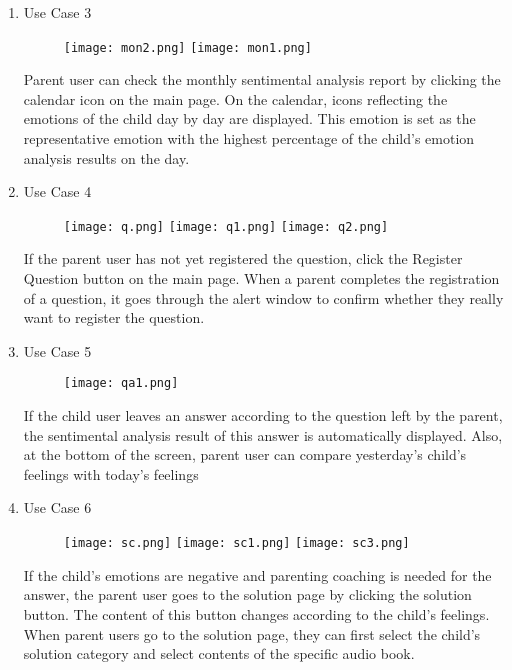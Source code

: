 \documentclass[conference]{IEEEtran}
\begin{document}
\begin{enumerate}
\begin{enumerate}
        \item Use Case 3
        \begin{figure}[H]
         \centering
         \texttt{[image: mon2.png]}
         \texttt{[image: mon1.png]}
         \end{figure}
        Parent user can check the monthly sentimental analysis report by clicking the calendar icon on the main page. On the calendar, icons reflecting the emotions of the child day by day are displayed. This emotion is set as the representative emotion with the highest percentage of the child's emotion analysis results on the day.
        \newpage
        \item Use Case 4
        \begin{figure}[H]
        \centering
        \texttt{[image: q.png]}
        \texttt{[image: q1.png]}
        \texttt{[image: q2.png]}
        \end{figure}
        If the parent user has not yet registered the question, click the Register Question button on the main page. When a parent completes the registration of a question, it goes through the alert window to confirm whether they really want to register the question.
        \newpage
        
        \item Use Case 5
        \begin{figure}[H]
        \centering
        \texttt{[image: qa1.png]}
        \end{figure}
        If the child user leaves an answer according to the question left by the parent, the sentimental analysis result of this answer is automatically displayed. Also, at the bottom of the screen, parent user can compare yesterday's child's feelings with today's feelings
        \newpage
        \item Use Case 6
        \begin{figure}[H]
        \centering
        \texttt{[image: sc.png]}
        \texttt{[image: sc1.png]}
        \texttt{[image: sc3.png]}
        \end{figure}
        If the child's emotions are negative and parenting coaching is needed for the answer, the parent user goes to the solution page by clicking the solution button. The content of this button changes according to the child's feelings. When parent users go to the solution page, they can first select the child's solution category and select contents of the specific audio book.
        \newpage
    

\end{enumerate}
\end{enumerate}
\end{document}
